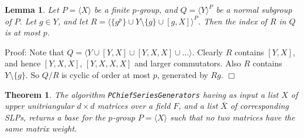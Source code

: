 \documentclass[12pt]{article}
\newtheorem{lemma}[definition]{Lemma}
\newtheorem{theorem}[definition]{Theorem}
\newenvironment{proof}{\normalsize {\sc Proof}:}{{\hfill $\Box$ \\}}
\begin{document}
\begin{lemma}
Let $P = \langle X \rangle$ be a finite $p$-group, and $Q = \langle Y \rangle^P$ be a normal subgroup of $P$. Let $g \in Y$, and let $R = \langle \{g^p\} \cup Y \setminus \{g\} \cup [g, X] \rangle^P$. Then the index of $R$ in $Q$ is at most $p$.
\end{lemma}

\begin{proof}
Note that $Q = \langle Y \cup [Y,X] \cup [Y,X,X] \cup \ldots \rangle$. Clearly $R$ contains $[Y,X]$, and hence $[Y,X,X]$, $[Y,X,X,X]$ and larger commutators. Also $R$ contains $Y \setminus \{g\}$. So $Q/R$ is cyclic of order at most $p$, generated by $Rg$.
\end{proof}

\begin{theorem}
The algorithm {\tt PChiefSeriesGenerators} having as input a list $X$ of upper unitriangular $d \times d$ matrices over a field $F$, and a list $\bar{X}$ of corresponding SLPs, returns a base for the $p$-group $P = \langle X \rangle$ such that no two matrices have the same matrix weight.
\end{theorem}
\end{document}
